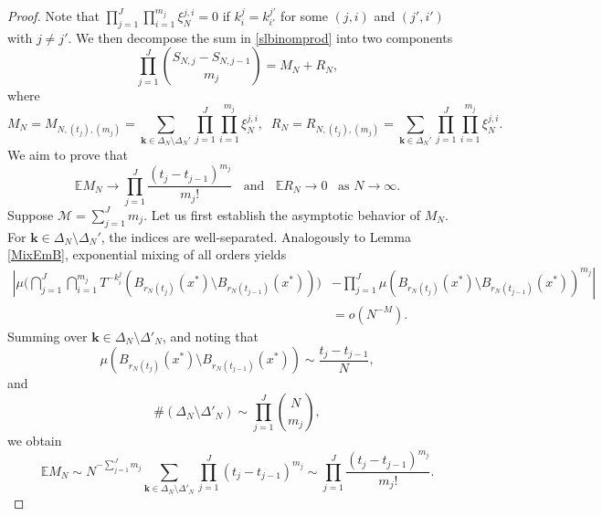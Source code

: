 \documentclass[11pt,twoside,a4paper,reqno]{amsart}
\newcommand{\as}[1]{\text{as } #1 \rightarrow\infty}
\begin{document}
\begin{proof}
Note that $ \prod_{j=1}^J \prod_{i=1}^{m_j} \xi_N^{j,i} = 0$ if $k^j_i = k^{j'}_{i'}$ for some $(j,i)$ and $(j',i')$ with $j \neq j'$. We then decompose the sum in \eqref{slbinomprod} into two components
\begin{equation*}
\prod_{j=1}^J {{S_{N,j} - S_{N,j-1}} \choose m_j} = M_N+R_N,
\end{equation*}
where
\begin{equation}\label{DecSNj}
M_N=M_{N,(t_j),(m_j)}= \sum_{\mathbf{k} \in \Delta_N \setminus \Delta_N'} \prod_{j=1}^J \prod_{i=1}^{m_j} \xi_N^{j,i}, \;\;
R_N=R_{N,(t_j),(m_j)}=\sum_{\mathbf{k} \in \Delta_N'} \prod_{j=1}^J \prod_{i=1}^{m_j} \xi_N^{j,i}.
\end{equation}
We aim to prove that
\begin{equation}\label{mlrlcon}
\mathbb{E}M_N \rightarrow \prod_{j=1}^{J} \frac{(t_j-t_{j-1})^{m_j}}{m_j!} \;\;\text{ and }\;\; \mathbb{E} R_N \rightarrow 0 \;\;\;\as{N}.
\end{equation}
Suppose $\mathcal{M}=\sum_{j=1}^J m_j.$ Let us first establish the asymptotic behavior of $M_N$.
For $\mathbf{k} \in \Delta_N \setminus \Delta_N'$, the indices are well-separated. Analogously to Lemma \ref{MixEmB}, exponential mixing of all orders yields
\begin{align*}
\left|\mu\biggl(\bigcap_{j=1}^J \bigcap_{i=1}^{m_j} T^{-k_i^j} \left(B_{r_N(t_j)}(x^*) \setminus B_{r_N(t_{j-1})}(x^*)\right)\biggr)\right.&\left.-\prod_{j=1}^J \mu \left(B_{r_N(t_j)}(x^*) \setminus B_{r_N(t_{j-1})}(x^*)\right)^{m_j}\right|\\
&=o(N^{-M}).
\end{align*}
Summing over $\mathbf{k}\in \Delta_N\setminus \Delta'_N$, and noting that
\begin{equation*}
\mu \left(B_{r_N(t_j)}(x^*) \setminus B_{r_N(t_{j-1})}(x^*)\right) \sim \frac{t_j-t_{j-1}}{N},
\end{equation*}
and
$$\#\left(\Delta_N\setminus \Delta'_N\right) \sim \prod_{j=1}^J {N \choose {m_j}},$$
we obtain
\begin{equation}\label{EMN}
\mathbb{E}M_N \sim N^{-\sum_{j=1}^J m_j} \sum_{\mathbf{k}\in \Delta_N\setminus \Delta'_N} \prod_{j=1}^J (t_j-t_{j-1})^{m_j} \sim \prod_{j=1}^{J} \frac{(t_j-t_{j-1})^{m_j}}{m_j!}.
\end{equation}




\end{proof}
\end{document}
